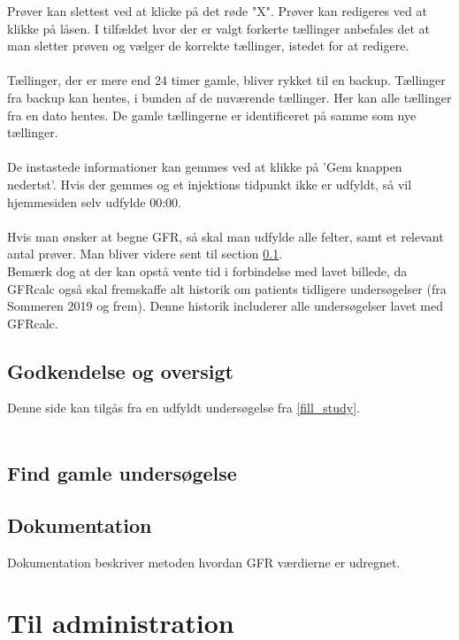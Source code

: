 \documentclass{article}
\begin{document}
Prøver kan slettest ved at klicke på det røde "X". Prøver kan redigeres ved at klikke på låsen. I tilfældet hvor der er valgt forkerte tællinger anbefales det at man sletter prøven og vælger de korrekte tællinger, istedet for at redigere.\\\\
Tællinger, der er mere end 24 timer gamle, bliver rykket til en backup. Tællinger fra backup kan hentes, i bunden af de nuværende tællinger. Her kan alle tællinger fra en dato hentes. De gamle tællingerne er identificeret på samme som nye tællinger.
\\\\
De instastede informationer kan gemmes ved at klikke på 'Gem knappen nedertst'. Hvis der gemmes og et injektions tidpunkt ikke er udfyldt, så vil hjemmesiden selv udfylde 00:00.\\\\
Hvis man ønsker at begne GFR, så skal man udfylde alle felter, samt et relevant antal prøver. Man bliver videre sent til section \ref{present_study}.\\
Bemærk dog at der kan opstå vente tid i forbindelse med lavet billede, da GFRcalc også skal fremskaffe alt historik om patients tidligere undersøgelser (fra Sommeren 2019 og frem). Denne historik includerer alle undersøgelser lavet med GFRcalc.  
\subsection{Godkendelse og oversigt}\label{present_study}
Denne side kan tilgås fra en udfyldt undersøgelse fra \ref{fill_study}.\\\\


\subsection{Find gamle undersøgelse}

\subsection{Dokumentation}\label{ref}
Dokumentation beskriver metoden hvordan GFR værdierne er udregnet. 
\newpage
\section{Til administration}
\end{document}
